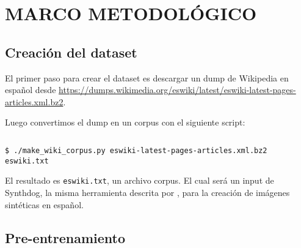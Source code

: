 \documentclass[../main.tex]{subfiles}
\begin{document}
\chapter{MARCO METODOLÓGICO}


\section{Creación del dataset}

El primer paso para crear el dataset es descargar un dump de Wikipedia en español desde \url{https://dumps.wikimedia.org/eswiki/latest/eswiki-latest-pages-articles.xml.bz2}.

Luego convertimos el dump en un corpus con el siguiente script:
\inputminted[bgcolor=codeBack, tabsize=2]{python}{make_wiki_corpus.py}
\begin{verbatim}
$ ./make_wiki_corpus.py eswiki-latest-pages-articles.xml.bz2 eswiki.txt
\end{verbatim}

El resultado es \texttt{eswiki.txt}, un archivo corpus.
El cual será un input de Synthdog, la misma herramienta descrita por \citet{kim2022ocrfree}, para la creación de imágenes sintéticas en español.


\section{Pre-entrenamiento}


\end{document}
